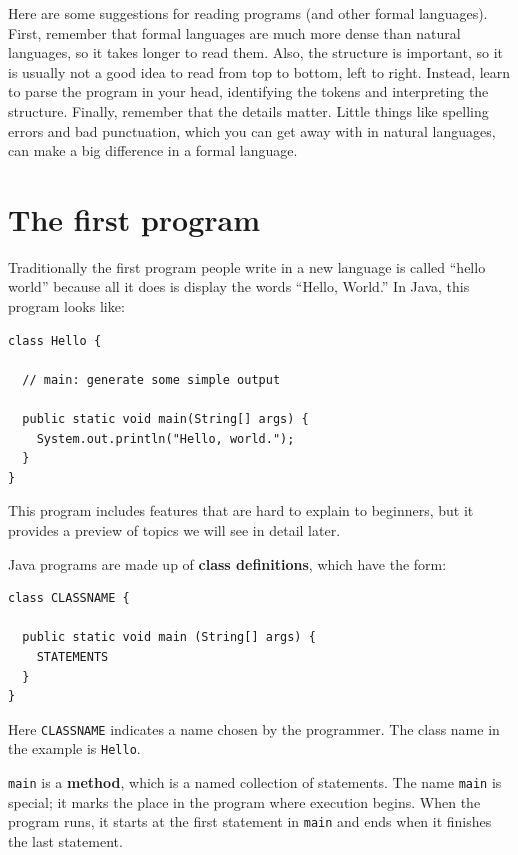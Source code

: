 \documentclass[12pt]{book}
\theoremstyle{exercise}
\begin{document}
Here are some suggestions for reading programs (and other formal
languages).  First, remember that formal languages are much more dense
than natural languages, so it takes longer to read them.  Also, the
structure is important, so it is usually not a good idea to read
from top to bottom, left to right.  Instead, learn to parse the
program in your head, identifying the tokens and interpreting the
structure.  Finally, remember that the details matter.  Little things
like spelling errors and bad punctuation, which you can get away
with in natural languages, can make a big difference in a formal
language.

\section{The first program}
\label{hello}

Traditionally the first program people write in a new language
is called ``hello world'' because all it does is display the
words ``Hello, World.''  In Java, this program looks like:

\begin{lstlisting}
class Hello {

  // main: generate some simple output

  public static void main(String[] args) {
    System.out.println("Hello, world.");
  }
}
\end{lstlisting}
%
This program includes features that are hard to explain to
beginners, but it provides a preview of topics we
will see in detail later.

Java programs are made up of {\bf class definitions}, which have
the form:


\begin{lstlisting}
class CLASSNAME {

  public static void main (String[] args) {
    STATEMENTS
  }
}
\end{lstlisting}
%
Here {\tt CLASSNAME} indicates a name chosen by the programmer.
The class name in the example is {\tt Hello}.


{\tt main} is a {\bf method}, which is a named collection of
statements.  The name {\tt main} is special; it marks the place in the
program where execution begins.  When the program runs, it starts at
the first statement in {\tt main} and ends when it finishes the last
statement.
\end{document}
